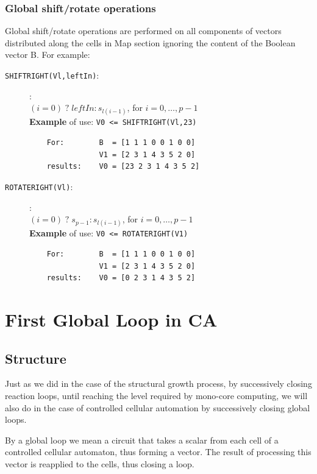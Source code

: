 \subsubsection{Global shift/rotate operations} 

Global shift/rotate operations are performed on all components of vectors distributed along the cells in Map section ignoring the content of the Boolean vector B. For example:
\begin{description}
    \item[{\tt SHIFTRIGHT(Vl,leftIn)}:]:   \\
    $ (i=0) \; ? \; leftIn : s_{l(i-1)}$, for $i = 0, \ldots, p-1$\\
    {\bf Example} of use: {\tt V0 <= SHIFTRIGHT(Vl,23)} 
    \begin{verbatim}
    For:        B  = [1 1 1 0 0 1 0 0]
                V1 = [2 3 1 4 3 5 2 0]
    results:    V0 = [23 2 3 1 4 3 5 2]
    \end{verbatim}
    \item[{\tt ROTATERIGHT(Vl)}:]:  \\
    $ (i=0) \; ? \; s_{p-1} : s_{l(i-1)}$, for $i = 0, \ldots, p-1$\\
    {\bf Example} of use: {\tt V0 <= ROTATERIGHT(V1)} 
    \begin{verbatim}
    For:        B  = [1 1 1 0 0 1 0 0]
                V1 = [2 3 1 4 3 5 2 0]
    results:    V0 = [0 2 3 1 4 3 5 2]
    \end{verbatim}
\end{description}

\section{{\bf First Global Loop} in CA}

\subsection{Structure}

Just as we did in the case of the structural growth process, by successively closing reaction loops, until reaching the level required by mono-core computing, we will also do in the case of controlled cellular automation by successively closing global loops.

By a global loop we mean a circuit that takes a scalar from each cell of a controlled cellular automaton, thus forming a vector. The result of processing this vector is reapplied to the cells, thus closing a loop.

